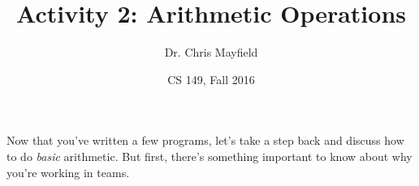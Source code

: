 \documentclass[11pt]{article}
\title{Activity 2: Arithmetic Operations}
\author{Dr. Chris Mayfield}
\date{CS 149, Fall 2016}
\begin{document}
\maketitle

Now that you've written a few programs, let's take a step back and discuss how to do \emph{basic} arithmetic.
But first, there's something important to know about why you're working in teams.






\end{document}
